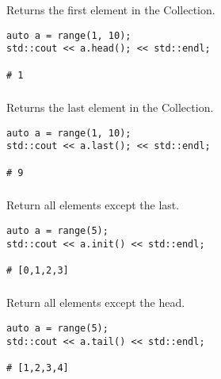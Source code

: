 Returns the first element in the Collection.

\begin{lstlisting}[title=example]
auto a = range(1, 10);
std::cout << a.head(); << std::endl;

# 1
\end{lstlisting}




\subsubsection{}

Returns the last element in the Collection.

\begin{lstlisting}[title=example]
auto a = range(1, 10);
std::cout << a.last(); << std::endl;

# 9
\end{lstlisting}




\subsubsection{}

Return all elements except the last.

\begin{lstlisting}[title=example]
auto a = range(5);
std::cout << a.init() << std::endl;

# [0,1,2,3]
\end{lstlisting}




\subsubsection{}

Return all elements except the head.

\begin{lstlisting}[title=example]
auto a = range(5);
std::cout << a.tail() << std::endl;

# [1,2,3,4]
\end{lstlisting}




\subsubsection{}

